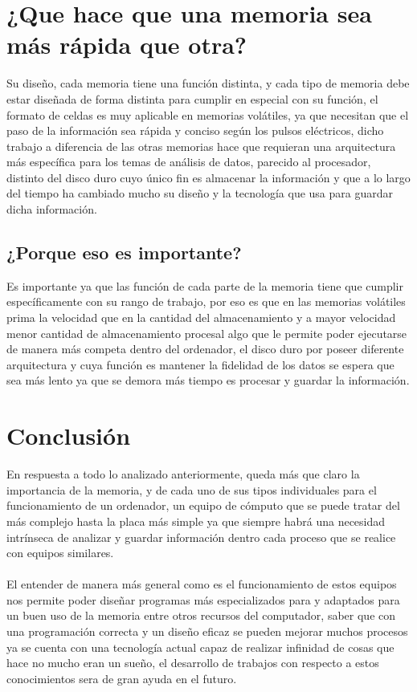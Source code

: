 \documentclass{article}
\begin{document}
	
	\section{¿Que hace que una memoria sea más rápida que otra?} \label{rapidez}
	Su diseño, cada memoria tiene una función distinta, y cada tipo de memoria debe estar diseñada de forma distinta para cumplir en especial con su función,\cite{youbioit} el formato de celdas es muy aplicable en memorias volátiles, ya que necesitan que el paso de la información sea rápida y conciso según los pulsos eléctricos, dicho trabajo a diferencia de las otras memorias hace que requieran una arquitectura más específica para los temas de análisis de datos, parecido al procesador, distinto del disco duro cuyo único fin es almacenar la información y que a lo largo del tiempo ha cambiado mucho su diseño y la tecnología que usa para guardar dicha información.
	\\
	\subsection{¿Porque eso es importante?}\label{importancia}
	Es importante ya que las función de cada parte de la memoria tiene que cumplir específicamente con su rango de trabajo, por eso es que en las memorias volátiles prima la velocidad que en la cantidad del almacenamiento y a mayor velocidad menor cantidad de almacenamiento procesal algo que le permite poder ejecutarse de manera más competa dentro del ordenador, el disco duro por poseer diferente arquitectura y cuya función es mantener la fidelidad de los datos se espera que sea más lento ya que se demora más tiempo es procesar y guardar la información.
	
	\newpage
	
	\section{Conclusión} \label{conclusion}
	En respuesta a todo lo analizado anteriormente, queda más que claro la importancia de la memoria, y de cada uno de sus tipos individuales para el funcionamiento de un ordenador, un equipo de cómputo que se puede tratar del más complejo hasta la placa más simple ya que siempre habrá una necesidad intrínseca de analizar y guardar información dentro cada proceso que se realice con equipos similares.
	\\\\
	El entender de manera más general como es el funcionamiento de estos equipos nos permite poder diseñar programas más especializados para y adaptados para un buen uso de la memoria entre otros recursos del computador, saber que con una programación correcta y un diseño eficaz se pueden mejorar muchos procesos ya se cuenta con una tecnología actual capaz de realizar infinidad de cosas que hace no mucho eran un sueño, el desarrollo de trabajos con respecto a estos conocimientos sera de gran ayuda en el futuro.
	
	\newpage
	
		
	
	
\end{document}
